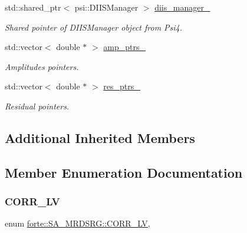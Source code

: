 \begin{DoxyCompactItemize}
\item 
std\+::shared\+\_\+ptr$<$ psi\+::\+D\+I\+I\+S\+Manager $>$ \mbox{\hyperlink{classforte_1_1_s_a___m_r_d_s_r_g_a23cf86be98b2a7b682cfec6cacb22c6c}{diis\+\_\+manager\+\_\+}}
\begin{DoxyCompactList}\small\item\em Shared pointer of D\+I\+I\+S\+Manager object from Psi4. \end{DoxyCompactList}\item 
std\+::vector$<$ double $\ast$ $>$ \mbox{\hyperlink{classforte_1_1_s_a___m_r_d_s_r_g_a6ea6eddb9570bc1f728ee185843281b1}{amp\+\_\+ptrs\+\_\+}}
\begin{DoxyCompactList}\small\item\em Amplitudes pointers. \end{DoxyCompactList}\item 
std\+::vector$<$ double $\ast$ $>$ \mbox{\hyperlink{classforte_1_1_s_a___m_r_d_s_r_g_a0ed50187690e4b74286075dc03a589e2}{res\+\_\+ptrs\+\_\+}}
\begin{DoxyCompactList}\small\item\em Residual pointers. \end{DoxyCompactList}\end{DoxyCompactItemize}
\subsection*{Additional Inherited Members}


\subsection{Member Enumeration Documentation}
\mbox{\label{classforte_1_1_s_a___m_r_d_s_r_g_ae418b53108b2015f68d267bb26d3e6ba}} 
\subsubsection{\texorpdfstring{C\+O\+R\+R\+\_\+\+LV}{CORR\_LV}}
{\footnotesize\ttfamily enum \mbox{\hyperlink{classforte_1_1_s_a___m_r_d_s_r_g_ae418b53108b2015f68d267bb26d3e6ba}{forte\+::\+S\+A\+\_\+\+M\+R\+D\+S\+R\+G\+::\+C\+O\+R\+R\+\_\+\+LV}}\hspace{0.3cm}{\ttfamily [strong]}, {\ttfamily [protected]}}



